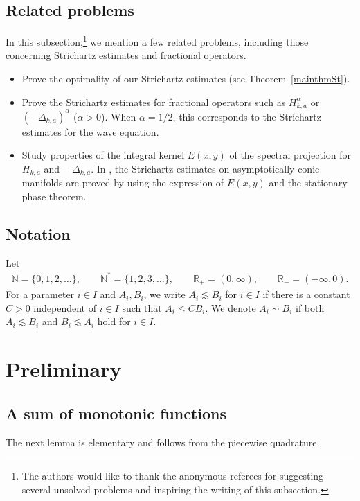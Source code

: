 \documentclass[10pt,a4paper]{amsart}
\numberwithin{equation}{section}
\def\R{\mathbb{R}}%
\def\a{\alpha}
\begin{document}
\subsection{Related problems}

In this subsection,\footnote{The authors would like to thank the anonymous referees for suggesting several unsolved problems and inspiring the writing of this subsection.} we mention a few related problems, including those concerning Strichartz estimates and fractional operators.
\begin{itemize}\itemsep=0pt
\item Prove the optimality of our Strichartz estimates (see Theorem~\ref{mainthmSt}).
\item Prove the Strichartz estimates for fractional operators such as $H_{k,a}^{\a}$ or $(-\Delta_{k,a})^{\a}$ ($\a>0$). When $\a=1/2$, this corresponds to the Strichartz estimates for the wave equation.
\item Study properties of the integral kernel $E(x,y)$ of the spectral projection for $H_{k,a}$ and~$-\Delta_{k,a}$. In \cite{HZ}, the Strichartz estimates on asymptotically conic manifolds are proved by using the expression of $E(x,y)$ and the stationary phase theorem.
\end{itemize}

\subsection{Notation}
Let
\begin{align*}
\mathbb{N}=\{0,1,2,\hdots\},\qquad \mathbb{N}^*=\{1,2,3,\hdots\}, \qquad \R_{+}=(0,\infty),\qquad \R_-=(-\infty,0).
\end{align*}
For a parameter $i\in I$ and $A_i,B_i$, we write $A_i\lesssim B_i$ for $i\in I$ if there is a constant $C>0$ independent of $i\in I$ such that $A_i\leq CB_i$. We denote $A_i\sim B_i$ if both $A_i\lesssim B_i$ and $B_i\lesssim A_i$ hold for $i\in I$.

\section{Preliminary}

\subsection{A sum of monotonic functions}

The next lemma is elementary and follows from the piecewise quadrature.
\end{document}
